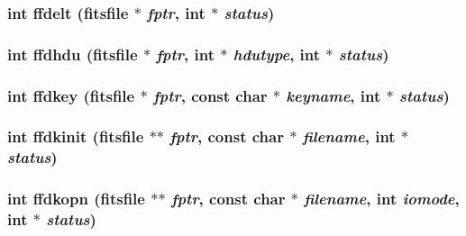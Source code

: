 \subsubsection{\setlength{\rightskip}{0pt plus 5cm}int ffdelt (\bf{fitsfile} $\ast$ {\em fptr}, int $\ast$ {\em status})}\label{fitsio__64_8h_02d32917d27a457a77ac003c7c6295dd}


\subsubsection{\setlength{\rightskip}{0pt plus 5cm}int ffdhdu (\bf{fitsfile} $\ast$ {\em fptr}, int $\ast$ {\em hdutype}, int $\ast$ {\em status})}\label{fitsio__64_8h_8805c9b8c1cc419ceb3e0f9e6779e6c4}


\subsubsection{\setlength{\rightskip}{0pt plus 5cm}int ffdkey (\bf{fitsfile} $\ast$ {\em fptr}, const char $\ast$ {\em keyname}, int $\ast$ {\em status})}\label{fitsio__64_8h_c07173729eb0c7f54c9b10e14dcc581f}


\subsubsection{\setlength{\rightskip}{0pt plus 5cm}int ffdkinit (\bf{fitsfile} $\ast$$\ast$ {\em fptr}, const char $\ast$ {\em filename}, int $\ast$ {\em status})}\label{fitsio__64_8h_9d80b85b1dd87a39313c42076dfccdcc}


\subsubsection{\setlength{\rightskip}{0pt plus 5cm}int ffdkopn (\bf{fitsfile} $\ast$$\ast$ {\em fptr}, const char $\ast$ {\em filename}, int {\em iomode}, int $\ast$ {\em status})}\label{fitsio__64_8h_891bfcf028003e840a9f554842123fce}


